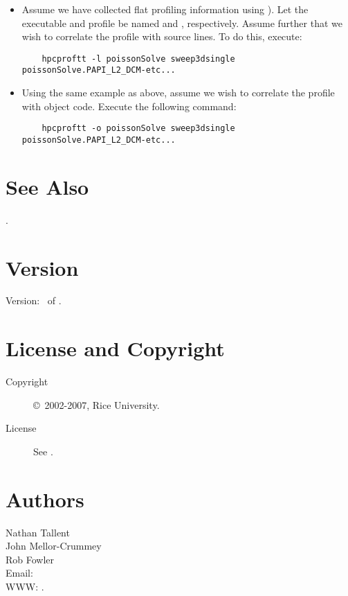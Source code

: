 \documentclass[english]{article}
\begin{document}
\begin{itemize}

\item Assume we have collected flat profiling information using  ).
Let the executable and profile be named  and , respectively.
Assume further that we wish to correlate the profile with source lines.
To do this, execute:
\begin{verbatim}
    hpcproftt -l poissonSolve sweep3dsingle poissonSolve.PAPI_L2_DCM-etc...
\end{verbatim}

\item Using the same example as above, assume we wish to correlate the profile with object code.  Execute the following command:
\begin{verbatim}
    hpcproftt -o poissonSolve sweep3dsingle poissonSolve.PAPI_L2_DCM-etc...
\end{verbatim}

\end{itemize}


\section{See Also}

.

\section{Version}

Version: \Version\ of \Date.

\section{License and Copyright}

\begin{description}
\item[Copyright] \copyright\ 2002-2007, Rice University.
\item[License] See .
\end{description}

\section{Authors}

\noindent
Nathan Tallent \\
John Mellor-Crummey \\
Rob Fowler \\
Email:  \\
WWW: .

\LatexManEnd
\end{document}
